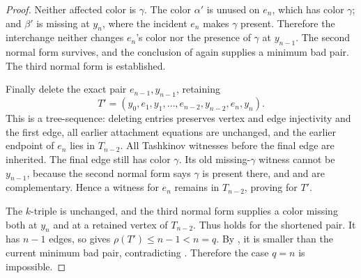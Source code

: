 \begin{proof}
Neither affected color is \(\gamma\).  The color \(\alpha'\) is unused
on \(e_n\), which has color \(\gamma\); and \(\beta'\) is missing at
\(y_n\), where the incident \(e_n\) makes \(\gamma\) present.  Therefore
the interchange neither changes \(e_n\)'s color nor the presence of
\(\gamma\) at \(y_{n-1}\).  The second normal form survives, and the
conclusion of  again supplies a
minimum bad pair.  The third normal form is established.

Finally delete the exact pair \(e_{n-1},y_{n-1}\), retaining
\[
 T'=(y_0,e_1,y_1,\ldots,e_{n-2},y_{n-2},e_n,y_n).
\]
This is a tree-sequence: deleting entries preserves vertex and edge
injectivity and the first edge, all earlier attachment equations are
unchanged, and the earlier endpoint of \(e_n\) lies in \(T_{n-2}\).
All Tashkinov witnesses before the final edge are inherited.  The final
edge still has color \(\gamma\).  Its old missing-\(\gamma\) witness
cannot be \(y_{n-1}\), because the second normal form says \(\gamma\) is
present there, and  and 
are complementary.  Hence a witness for \(e_n\) remains in
\(T_{n-2}\), proving  for \(T'\).

The \(k\)-triple is unchanged, and the third normal form supplies a color
missing both at \(y_n\) and at a retained vertex of \(T_{n-2}\).  Thus
 holds for the shortened pair.  It has \(n-1\)
edges, so  gives
\(\rho(T')\le n-1<n=q\).  By , it is smaller
than the current minimum bad pair, contradicting
.  Therefore the case \(q=n\) is
impossible.
\end{proof}
